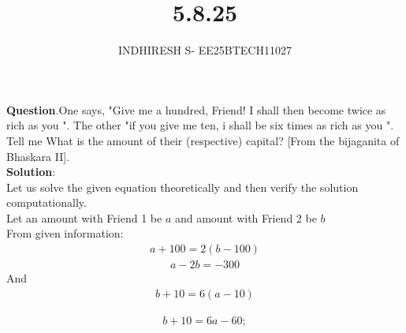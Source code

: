 \documentclass[journal]{IEEEtran}
\theoremstyle{remark}
\begin{document}

\onecolumn

\title{5.8.25}
\author{INDHIRESH S- EE25BTECH11027}
\maketitle


\renewcommand{\thefigure}{\theenumi}
\renewcommand{\thetable}{\theenumi}

\textbf{Question}.One says, "Give me a hundred, Friend! I shall then become twice as rich as you ". The other "if you give me ten, i shall be six times as rich as you ". Tell me What is the amount of their (respective) capital? [From the bijaganita of Bhaskara II].\\
\textbf{Solution}:\\
Let us solve the given equation theoretically and then verify the solution computationally. \\
Let an amount with Friend 1 be $a$ and amount with Friend 2 be $b$\\
From given information:
\begin{align}
   a+100=2(b-100)
\end{align}
\begin{align}
 a-2b=-300
\end{align}
And
\begin{align}
  b+10=6(a-10)
 \end{align}

\begin{align}
   b+10=6a-60;
\end{align}
\end{document}
